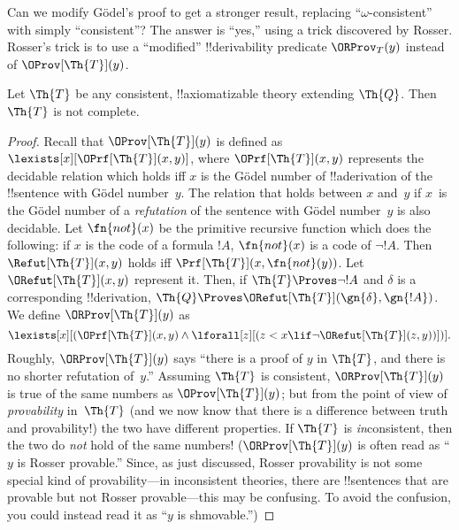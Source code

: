 \documentclass[../../../include/open-logic-section]{subfiles}
\begin{document}


Can we modify G\"odel's proof to get a stronger result, replacing
``$\omega$-consistent'' with simply ``consistent''? The answer is
``yes,'' using a trick discovered by Rosser.  Rosser's trick is to use
a ``modified'' !!{derivability} predicate $\ORProv_T(y)$ instead of
$\OProv[\Th{T}](y)$.

\begin{thm}
Let $\Th{T}$ be any consistent, !!{axiomatizable} theory
extending $\Th{Q}$. Then $\Th{T}$ is not complete.
\end{thm}

\begin{proof}
Recall that $\OProv[\Th{T}](y)$ is defined as $\lexists[x][\OPrf[\Th{T}](x,
  y)]$, where $\OPrf[\Th{T}](x, y)$ represents the decidable relation which
holds iff $x$ is the G\"odel number of !!a{derivation} of the
!!{sentence} with G\"odel number~$y$. The relation that holds between
$x$ and~$y$ if $x$~is the G\"odel number of a \emph{refutation} of the
sentence with G\"odel number~$y$ is also decidable. Let $\fn{not}(x)$
be the primitive recursive function which does the following: if $x$
is the code of a formula $!A$, $\fn{not}(x)$ is a code of $\lnot
!A$. Then $\Refut[\Th{T}](x, y)$ holds iff $\Prf[\Th{T}](x, \fn{not}(y))$.  Let
$\ORefut[\Th{T}](x, y)$ represent it.  Then, if $\Th{T} \Proves \lnot !A$
and $\delta$ is a corresponding !!{derivation}, $\Th{Q} \Proves
\ORefut[\Th{T}](\gn{\delta}, \gn{!A})$.  We define $\ORProv[\Th{T}](y)$ as
\[
\lexists[x][(\OPrf[\Th{T}](x,y) \land \lforall[z][(z < x \lif \lnot
  \ORefut[\Th{T}](z,y))])].
\]
Roughly, $\ORProv[\Th{T}](y)$ says ``there is a proof of $y$ in $\Th{T}$,
and there is no shorter refutation of~$y$.''  Assuming $\Th{T}$ is
consistent, $\ORProv[\Th{T}](y)$ is true of the same numbers as
$\OProv[\Th{T}](y)$; but from the point of view of \emph{provability}
in~$\Th{T}$ (and we now know that there is a difference between truth
and provability!) the two have different properties. If $\Th{T}$ is
\emph{in}consistent, then the two do \emph{not} hold of the same
numbers!{} ($\ORProv[\Th{T}](y)$ is often read as ``$y$ is Rosser
provable.'' Since, as just discussed, Rosser provability is not some
special kind of provability---in inconsistent theories, there are
!!{sentence}s that are provable but not Rosser provable---this may be
confusing. To avoid the confusion, you could instead read it as
``$y$ is shmovable.'')


\end{proof}
\end{document}
